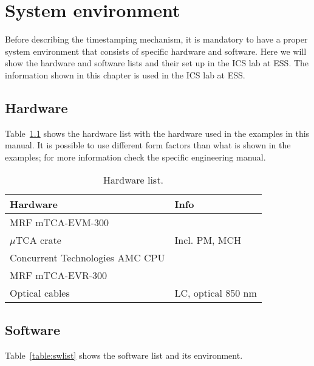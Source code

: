 \documentclass[11pt
  , a4paper
  , article
  , oneside
  , showtrims
]{memoir}
\begin{document}

\chapter{System environment}
Before describing the timestamping mechanism, it is mandatory to have a proper system environment that consists of specific hardware and software. Here we will show the hardware and software lists and their set up in the ICS lab at ESS. The information shown in this chapter is used in the ICS lab at ESS.\\

\section{Hardware}
Table~\ref{table:hwlist} shows the hardware list with the hardware used in the examples in this manual. It is possible to use different form factors than what is shown in the examples; for more information check the specific engineering manual.\\

\begin{table}[!htb]
  \centering
  \begin{tabular}{l|l}
    \toprule
    Hardware                        & Info               \\\midrule
    MRF mTCA-EVM-300                &                    \\\midrule
    $\mu$TCA crate                  & Incl. PM, MCH      \\\midrule
    Concurrent Technologies AMC CPU &                    \\\midrule
    MRF mTCA-EVR-300                &                    \\\midrule
    Optical cables                  & LC, optical 850 nm \\\bottomrule
  \end{tabular}
  \caption[]{Hardware list.}
  \label{table:hwlist}
\end{table}

\section{Software}
Table~\ref{table:swlist} shows the software list and its environment.\\
\end{document}
